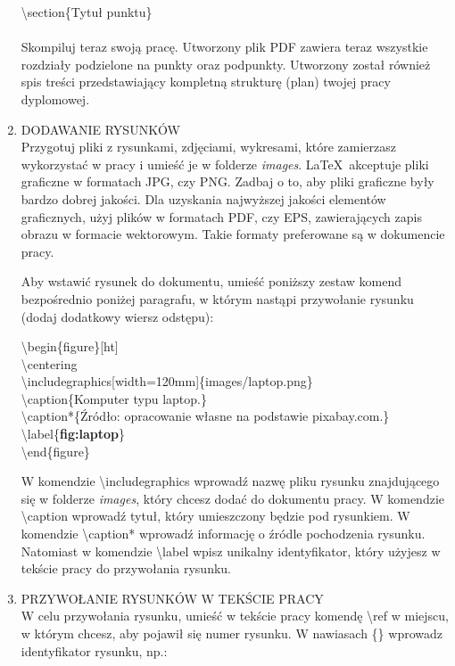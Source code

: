 \begin{enumerate}
	\textbackslash section\{Tytuł punktu\}\\\\
	
	Skompiluj teraz swoją pracę. Utworzony plik PDF zawiera teraz wszystkie rozdziały podzielone na punkty oraz podpunkty. Utworzony został również spis treści przedstawiający kompletną strukturę (plan) twojej pracy dyplomowej.
	
	\item DODAWANIE RYSUNKÓW\\
	Przygotuj pliki z rysunkami, zdjęciami, wykresami, które zamierzasz wykorzystać w pracy i umieść je w folderze \textit{images}. \LaTeX~akceptuje pliki graficzne w formatach JPG, czy PNG. Zadbaj o to, aby pliki graficzne były bardzo dobrej jakości. Dla uzyskania najwyższej jakości elementów graficznych, użyj plików w formatach PDF, czy EPS, zawierających zapis obrazu w formacie wektorowym. Takie formaty preferowane są w dokumencie pracy.
	
	Aby wstawić rysunek do dokumentu, umieść poniższy zestaw komend bezpośrednio poniżej paragrafu, w którym nastąpi przywołanie rysunku (dodaj dodatkowy wiersz odstępu):
	
	\textbackslash begin\{figure\}[ht]\\
		\textbackslash centering\\
		\textbackslash includegraphics[width=120mm]\{images/laptop.png\}\\
		\textbackslash caption\{Komputer typu laptop.\}\\
		\textbackslash caption*\{Źródło: opracowanie własne na podstawie pixabay.com.\}\\
		\textbackslash label\{\textbf{fig:laptop}\}\\
	\textbackslash end\{figure\}
	
	W komendzie \textbackslash includegraphics wprowadź nazwę pliku rysunku znajdującego się w folderze \textit{images}, który chcesz dodać do dokumentu pracy. W komendzie \textbackslash caption wprowadź tytuł, który umieszczony będzie pod rysunkiem. W komendzie \textbackslash caption* wprowadź informację o źródle pochodzenia rysunku. Natomiast w komendzie \textbackslash label wpisz unikalny identyfikator, który użyjesz w tekście pracy do przywołania rysunku.
	
	\item PRZYWOŁANIE RYSUNKÓW W TEKŚCIE PRACY\\
	W celu przywołania rysunku, umieść w tekście pracy komendę \textbackslash ref w miejscu, w którym chcesz, aby pojawił się numer rysunku. W nawiasach \{\} wprowadz identyfikator rysunku, np.:
	

\end{enumerate}
